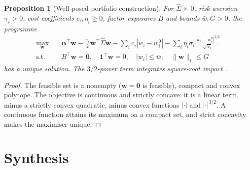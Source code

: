\documentclass[11pt,a4paper]{article}
\theoremstyle{plain}
\newtheorem{proposition}[theorem]{Proposition}
\theoremstyle{definition}
\theoremstyle{remark}
\newcommand{\w}{\bm{w}}
\begin{document}
\begin{proposition}[Well-posed portfolio construction]\label{prop:convex}
For $\hat\Sigma\succ0$, risk aversion $\gamma_r>0$, cost coefficients $c_i,\eta_i\ge0$, factor exposures $B$ and bounds $\bar w,G>0$, the programme
\begin{align*}
  \max_{\w}\quad & \bm\alpha^\top\w-\tfrac{\gamma_r}{2}\w^\top\hat\Sigma\w-\sum_ic_i|w_i-w_i^0|-\sum_i\eta_i\sigma_i\frac{|w_i-w_i^0|^{3/2}}{\sqrt{V_i}}\\
  \text{s.t.}\quad & B^\top\w=\bm 0,\quad \bm 1^\top\w=0,\quad |w_i|\le\bar w,\quad \|\w\|_1\le G
\end{align*}
has a unique solution. The $3/2$-power term integrates square-root impact \citep{bouchaud2018}.
\end{proposition}
\begin{proof}
The feasible set is a nonempty ($\w=\bm 0$ is feasible), compact and convex polytope. The objective is continuous and strictly concave: it is a linear term, minus a strictly convex quadratic, minus convex functions $|\cdot|$ and $|\cdot|^{3/2}$. A continuous function attains its maximum on a compact set, and strict concavity makes the maximiser unique.
\end{proof}

\section{Synthesis}\label{sec:synthesis}
\end{document}
